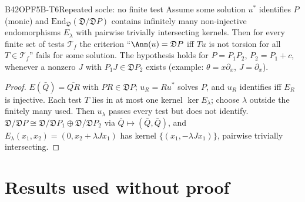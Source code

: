 \begin{dimcard}{B42}{OPF5B-T6}{Repeated socle: no finite test}{\pw}{}
\label{dim:OPF5B-L5}\label{dim:OPF5B-P7}%
Assume some solution $u^*$ identifies $P$ (monic) and $\mathrm{End}_{\mathfrak D}(\mathfrak D/\mathfrak DP)$ contains infinitely many non-injective endomorphisms $E_\lambda$ with pairwise trivially intersecting kernels. Then for every finite set of tests $\mathcal T_f$ the criterion ``$\Ann(u)=\mathfrak DP$ iff $Tu$ is not torsion for all $T\in\mathcal T_f$'' fails for some solution. The hypothesis holds for $P=P_1P_2$, $P_2=P_1+c$, whenever a nonzero $J$ with $P_1J\in\mathfrak DP_2$ exists (example: $\theta=x\partial_x$, $J=\partial_x$).
\end{dimcard}
\begin{proof}
$E(\bar Q)=\overline{QR}$ with $PR\in\mathfrak DP$; $u_R=Ru^*$ solves $P$, and $u_R$ identifies iff $E_R$ is injective.
Each test $T$ lies in at most one kernel $\ker E_\lambda$; choose $\lambda$ outside the finitely many used. Then $u_\lambda$ passes every test but does not identify.
$\mathfrak D/\mathfrak DP\cong\mathfrak D/\mathfrak DP_1\oplus\mathfrak D/\mathfrak DP_2$ via $\bar Q\mapsto(\bar Q,\bar Q)$, and $E_\lambda(x_1,x_2)=(0,x_2+\lambda Jx_1)$ has kernel $\{(x_1,-\lambda Jx_1)\}$, pairwise trivially intersecting.
\end{proof}

\section{Results used without proof}

